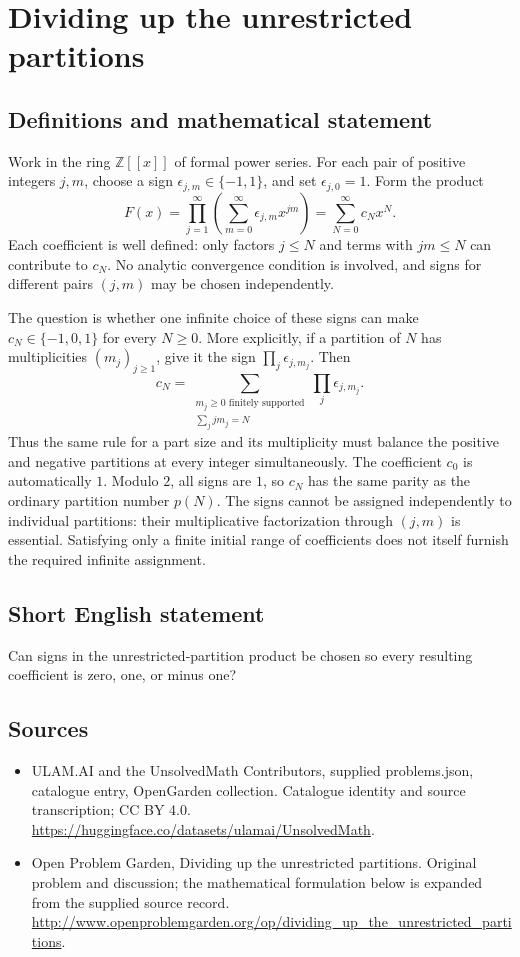 \documentclass[11pt,a4paper]{article}
\begin{document}
\section*{Dividing up the unrestricted partitions}\label{statement}

\subsection{Definitions and mathematical statement}
Work in the ring $\mathbb Z[[x]]$ of formal power series. For each pair
of positive integers $j,m$, choose a sign $\epsilon_{j,m}\in\{-1,1\}$,
and set $\epsilon_{j,0}=1$. Form the product
\[
 F(x)=\prod_{j=1}^{\infty}\left(\sum_{m=0}^{\infty}
                      \epsilon_{j,m}x^{jm}\right)
      =\sum_{N=0}^{\infty}c_Nx^N.
\]
Each coefficient is well defined: only factors $j\le N$ and terms with
$jm\le N$ can contribute to $c_N$. No analytic convergence condition is
involved, and signs for different pairs $(j,m)$ may be chosen independently.

The question is whether one infinite choice of these signs can make
$c_N\in\{-1,0,1\}$ for every $N\ge0$. More explicitly, if a partition
of $N$ has multiplicities $(m_j)_{j\ge1}$, give it the sign
$\prod_j\epsilon_{j,m_j}$. Then
\[
 c_N=\sum_{\substack{m_j\ge0\text{ finitely supported}\\
                       \sum_jjm_j=N}}\prod_j\epsilon_{j,m_j}.
\]
Thus the same rule for a part size and its multiplicity must balance the
positive and negative partitions at every integer simultaneously. The
coefficient $c_0$ is automatically $1$. Modulo $2$, all signs are $1$, so
$c_N$ has the same parity as the ordinary partition number $p(N)$.
The signs cannot be assigned independently to individual partitions:
their multiplicative factorization through $(j,m)$ is essential. Satisfying
only a finite initial range of coefficients does not itself furnish the
required infinite assignment.
\subsection{Short English statement}
Can signs in the unrestricted-partition product be chosen so every resulting coefficient is zero, one, or minus one?
\subsection{Sources}
\begin{itemize}
\item[S1] ULAM.AI and the UnsolvedMath Contributors, supplied problems.json, catalogue entry, OpenGarden collection. Catalogue identity and source transcription; CC BY 4.0.
\url{https://huggingface.co/datasets/ulamai/UnsolvedMath}.
\item[S2] Open Problem Garden, Dividing up the unrestricted partitions. Original problem and discussion; the mathematical formulation below is expanded from the supplied source record.
\url{http://www.openproblemgarden.org/op/dividing_up_the_unrestricted_partitions}.
\end{itemize}
\end{document}
